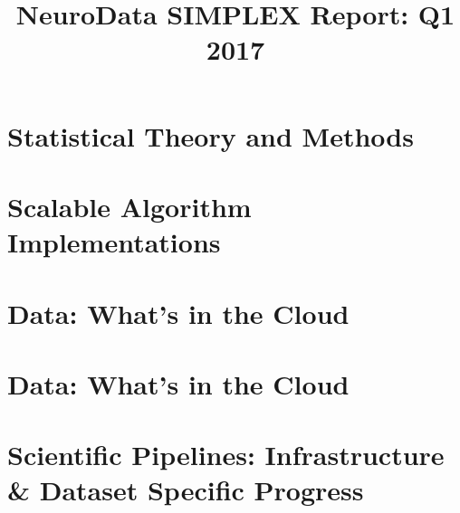 \documentclass[12pt]{article}
\title{NeuroData SIMPLEX Report: Q1 2017}
\begin{document}

\newpage



\section{Statistical Theory and Methods}







%

%
%
%

\section{Scalable Algorithm Implementations}






\section{Data: What's in the Cloud}

\clearpage

\section{Data: What's in the Cloud}

\clearpage


\section{Scientific Pipelines: Infrastructure \& Dataset Specific
  Progress}



%







\end{document}
